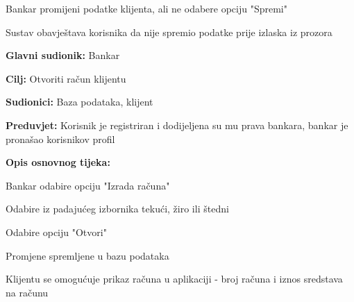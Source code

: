 \begin{packed_item}
\begin{packed_item}
\begin{packed_enum}
                  		
                  	\end{packed_enum}
                
                    \item[4.a] Bankar promijeni podatke klijenta, ali ne odabere opciju "Spremi" 
                    \item[] \begin{packed_enum}
                      
                      \item  Sustav obavještava korisnika da nije spremio podatke prije izlaska iz prozora
                      
                    \end{packed_enum}
                  
                \end{packed_item}
            \end{packed_item}
        
        
                
               \noindent {}
                \begin{packed_item}
            
                  \item \textbf{Glavni sudionik: }Bankar
                  \item  \textbf{Cilj:} Otvoriti račun klijentu
                  \item  \textbf{Sudionici:} Baza podataka, klijent
                  \item  \textbf{Preduvjet:} Korisnik je registriran i dodijeljena su mu prava bankara, bankar je pronašao korisnikov profil
                  \item  \textbf{Opis osnovnog tijeka:}
                  
                  \item[] \begin{packed_enum}
                
                    \item Bankar odabire opciju "Izrada računa" 
                    \item Odabire iz padajućeg izbornika tekući, žiro ili štedni
                    \item Odabire opciju "Otvori"
                    \item Promjene spremljene u bazu podataka                 
                    \item Klijentu se omogućuje prikaz računa u aplikaciji - broj računa i iznos sredstava na računu
                   \end{packed_enum}
                  
                \end{packed_item}
                
